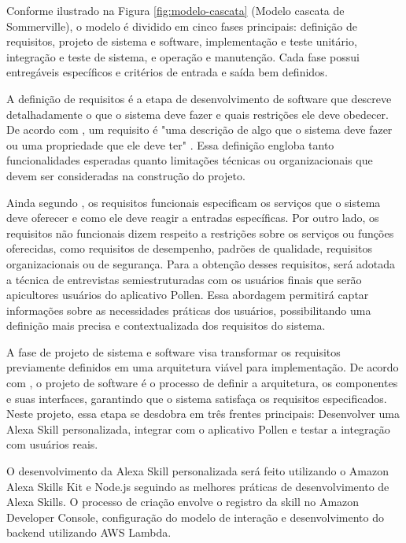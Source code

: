 Conforme ilustrado na Figura \ref{fig:modelo-cascata} (Modelo cascata de Sommerville), o modelo é dividido em cinco fases principais: definição de requisitos, 
projeto de sistema e software, implementação e teste unitário, integração e teste de sistema, e operação e manutenção. 
Cada fase possui entregáveis específicos e critérios de entrada e saída bem definidos.

\label{sssec:def-requisitos}

A definição de requisitos é a etapa de desenvolvimento de software que descreve detalhadamente o que o sistema deve fazer e quais restrições ele deve obedecer. 
De acordo com \textcite{sommerville2011}, um requisito é "uma descrição de algo que o sistema deve fazer ou uma propriedade que ele deve ter" \cite[p. 82]{sommerville2011}. 
Essa definição engloba tanto funcionalidades esperadas quanto limitações técnicas ou organizacionais que devem ser consideradas na construção do projeto.

Ainda segundo \textcite{sommerville2011}, os requisitos funcionais especificam os serviços que o sistema deve oferecer e como ele deve reagir a entradas específicas. 
Por outro lado, os requisitos não funcionais dizem respeito a restrições sobre os serviços ou funções oferecidas, como requisitos de desempenho, padrões de qualidade, requisitos organizacionais ou de segurança. 
Para a obtenção desses requisitos, será adotada a técnica de entrevistas semiestruturadas com os usuários finais que serão apicultores usuários do aplicativo Pollen. 
Essa abordagem permitirá captar informações sobre as necessidades práticas dos usuários, possibilitando uma definição mais precisa e contextualizada dos requisitos do sistema.

\label{sssec:proj-sistema}

A fase de projeto de sistema e software visa transformar os requisitos previamente definidos em uma arquitetura viável para implementação. 
De acordo com \textcite{sommerville2011}, o projeto de software é o processo de definir a arquitetura, os componentes e suas interfaces, garantindo que o sistema satisfaça os requisitos especificados. 
Neste projeto, essa etapa se desdobra em três frentes principais: Desenvolver uma Alexa Skill personalizada, integrar com o aplicativo Pollen e testar a integração com usuários reais.

O desenvolvimento da Alexa Skill personalizada será feito utilizando o Amazon Alexa Skills Kit e Node.js seguindo as melhores práticas de desenvolvimento de Alexa Skills. O processo de criação envolve o registro da skill no Amazon Developer Console, configuração do modelo de interação e desenvolvimento do backend utilizando AWS Lambda.

